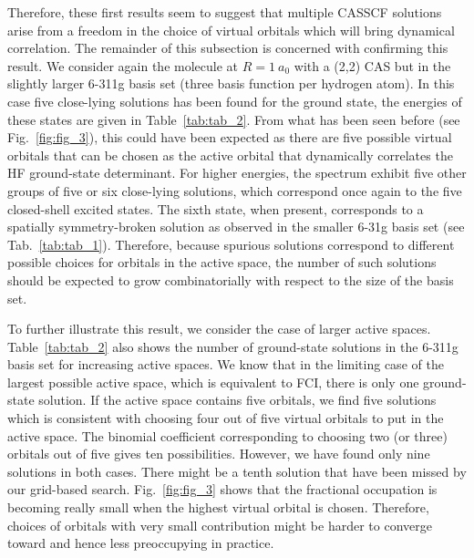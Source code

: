 \documentclass[aip,jcp,reprint,noshowkeys,superscriptaddress]{revtex4-1}
\begin{document}
Therefore, these first results seem to suggest that multiple CASSCF solutions arise from a freedom in the choice of virtual orbitals which will bring dynamical correlation.
The remainder of this subsection is concerned with confirming this result.
We consider again the  molecule at $R=1~a_0$ with a (2,2) CAS but in the slightly larger 6-311g basis set (three basis function per hydrogen atom). \cite{Krishnan_1980}
In this case five close-lying solutions has been found for the ground state, the energies of these states are given in Table~\ref{tab:tab_2}.
From what has been seen before (see Fig.~\ref{fig:fig_3}), this could have been expected as there are five possible virtual orbitals that can be chosen as the active orbital that dynamically correlates the HF ground-state determinant.
For higher energies, the spectrum exhibit five other groups of five or six close-lying solutions, which correspond once again to the five closed-shell excited states.
The sixth state, when present, corresponds to a spatially symmetry-broken solution as observed in the smaller 6-31g basis set (see Tab.~\ref{tab:tab_1}).
Therefore, because spurious solutions correspond to different possible choices for orbitals in the active space, the number of such solutions should be expected to grow combinatorially with respect to the size of the basis set.

To further illustrate this result, we consider the case of larger active spaces.
Table~\ref{tab:tab_2} also shows the number of ground-state solutions in the 6-311g basis set for increasing active spaces.
We know that in the limiting case of the largest possible active space, which is equivalent to FCI, there is only one ground-state solution.
If the active space contains five orbitals, we find five solutions which is consistent with choosing four out of five virtual orbitals to put in the active space.
The binomial coefficient corresponding to choosing two (or three) orbitals out of five gives ten possibilities.
However, we have found only nine solutions in both cases.
There might be a tenth solution that have been missed by our grid-based search.
Fig.~\ref{fig:fig_3} shows that the fractional occupation is becoming really small when the highest virtual orbital is chosen.
Therefore, choices of orbitals with very small contribution might be harder to converge toward and hence less preoccupying in practice.
\end{document}
